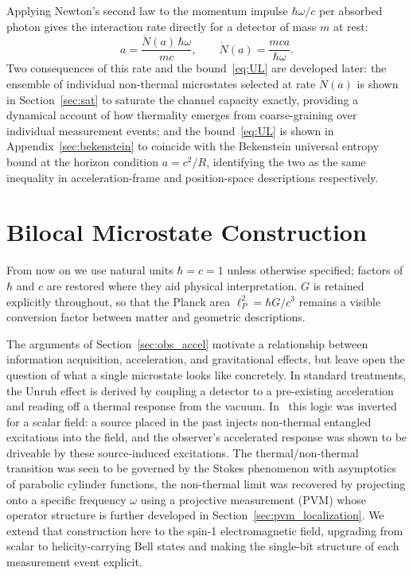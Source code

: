 \documentclass[12pt,a4paper]{article}
\begin{document}
Applying Newton's second law to the momentum impulse 
$\hbar\omega/c$ per absorbed photon gives the interaction 
rate directly for a detector of mass $m$ at rest:
%
\begin{equation}
    a = \frac{\dot{N}(a)\,\hbar\omega}{mc},
    \qquad
    \dot{N}(a) = \frac{mca}{\hbar\omega}.
\label{eq:newton_rate}
\end{equation}
%
Two consequences of this rate and the 
bound~\eqref{eq:UL} are developed later: the ensemble 
of individual non-thermal microstates selected at rate 
$\dot{N}(a)$ is shown in Section~\ref{sec:sat} to 
saturate the channel capacity exactly, 
providing a dynamical account of how thermality emerges 
from coarse-graining over individual measurement events; 
and the bound~\eqref{eq:UL} is shown in 
Appendix~\ref{sec:bekenstein} to coincide with the 
Bekenstein universal entropy bound at the horizon 
condition $a = c^2/R$, identifying the two as the same 
inequality in acceleration-frame and position-space 
descriptions respectively.

\section{Bilocal Microstate Construction}
\label{sec:microstates}

From now on we use natural units $\hbar = c = 1$ unless 
otherwise specified; factors of $\hbar$ and $c$ are restored 
where they aid physical interpretation. $G$ is retained 
explicitly throughout, so that the Planck area 
$\ell_P^2 = \hbar G/c^3$ remains a visible conversion factor 
between matter and geometric descriptions.

The arguments of Section~\ref{sec:obs_accel} motivate a 
relationship between information acquisition, 
acceleration, and gravitational effects, but leave open the 
question of what a single microstate looks like concretely. 
In standard treatments, the Unruh effect is derived by 
coupling a detector to a pre-existing acceleration and reading 
off a thermal response from the vacuum. 
In~\cite{player2025driving} this logic was inverted for a 
scalar field: a source placed in the past injects non-thermal 
entangled excitations into the field, and the observer's 
accelerated response was shown to be driveable by these 
source-induced excitations. The thermal/non-thermal 
transition was seen to be governed by the Stokes phenomenon with asymptotics 
of parabolic cylinder functions,
the non-thermal limit was recovered by projecting onto a 
specific frequency $\omega$ using a projective measurement (PVM) 
whose operator structure is further developed in
Section~\ref{sec:pvm_localization}.
We extend that construction here to the spin-1 electromagnetic 
field, upgrading from scalar to helicity-carrying Bell states 
and making the single-bit structure of each measurement event 
explicit.
\end{document}
